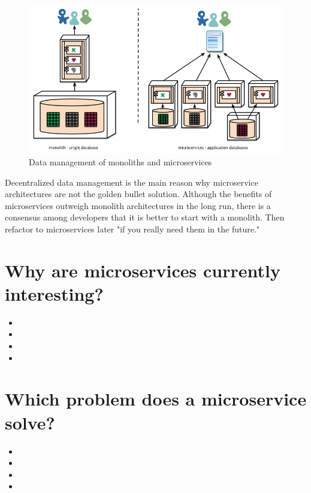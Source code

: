 \begin{figure}[ht]
  \centering
  \includegraphics[width=0.7\linewidth]{assets/decentralised-data.png}
  \caption{Data management of monoliths and microservices}
  \label{fig:decentralised-data}
\end{figure}

Decentralized data management is the main reason why microservice architectures are not the golden bullet solution. Although the benefits of microservices outweigh monolith architectures in the long run, there is a consensus among developers that it is better to start with a monolith. Then refactor to microservices later "if you really need them in the future." ~\cite{krivtsov.2019}


\section{Why are microservices currently interesting?}

\begin{itemize}
  \item {}
  \item {}
  \item {}
  \item {}
\end{itemize}


\section{Which problem does a microservice solve?}
\label{sec:theory:what-problem}

\begin{itemize}
  \item {}
  \item {}
  \item {}
  \item {}
\end{itemize}


